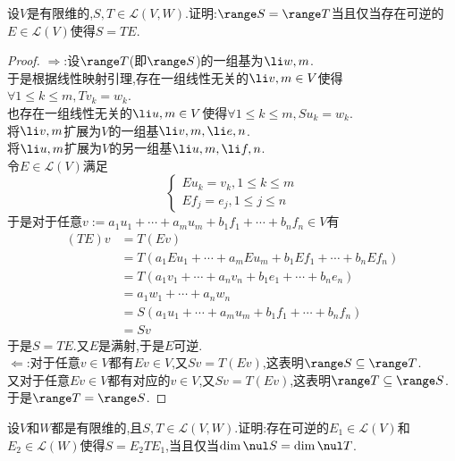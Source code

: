 \documentclass{ctexart}
\begin{document}
\begin{problem}[7.]
    设$V$是有限维的,$S,T\in\mathcal{L}(V,W)$.证明:$\range S=\range T$当且仅当存在可逆的$E\in\mathcal{L}(V)$使得$S=TE$.
\end{problem}
\begin{proof}
    $\Rightarrow$:设$\range T$(即$\range S$)的一组基为$\li w,m$.\\
    于是根据线性映射引理,存在一组线性无关的$\li v,m\in V$使得$\forall 1\leqslant k\leqslant m,Tv_k=w_k$.\\
    也存在一组线性无关的$\li u,m\in V$使得$\forall 1\leqslant k\leqslant m,Su_k=w_k$.\\
    将$\li v,m$扩展为$V$的一组基$\li v,m,\li e,n$.\\
    将$\li u,m$扩展为$V$的另一组基$\li u,m,\li f,n$.\\
    令$E\in\mathcal{L}(V)$满足
    $$\left\{\begin{array}{l}
        Eu_k=v_k,1\leqslant k\leqslant m\\
        Ef_j=e_j,1\leqslant j\leqslant n
    \end{array}\right.$$
    于是对于任意$v:=a_1u_1+\cdots+a_mu_m+b_1f_1+\cdots+b_nf_n\in V$有
    $$\begin{aligned}
        (TE)v
        &= T(Ev) \\
        &= T(a_1Eu_1+\cdots+a_mEu_m+b_1Ef_1+\cdots+b_nEf_n) \\
        &= T(a_1v_1+\cdots+a_nv_n+b_1e_1+\cdots+b_ne_n) \\
        &= a_1w_1+\cdots+a_nw_n \\
        &= S(a_1u_1+\cdots+a_mu_m+b_1f_1+\cdots+b_nf_n) \\
        &= Sv
    \end{aligned}$$
    于是$S=TE$.又$E$是满射,于是$E$可逆.\\
    $\Leftarrow$:对于任意$v\in V$都有$Ev\in V$,又$Sv=T(Ev)$,这表明$\range S\subseteq\range T$.\\
    又对于任意$Ev\in V$都有对应的$v\in V$,又$Sv=T(Ev)$,这表明$\range T\subseteq\range S$.\\
    于是$\range T=\range S$.
\end{proof}
\begin{problem}[8.]
    设$V$和$W$都是有限维的,且$S,T\in\mathcal{L}(V,W)$.证明:存在可逆的$E_1\in\mathcal{L}(V)$和$E_2\in\mathcal{L}(W)$使得$S=E_2TE_1$,当且仅当$\dim\nul S=\dim\nul T$.
\end{problem}
\end{document}
